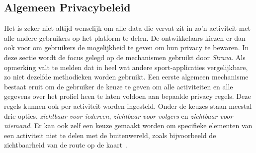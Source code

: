 \subsection{Algemeen Privacybeleid}\label{sec:Algemene Privacy}
Het is zeker niet altijd wenselijk om alle data die vervat zit in zo'n
activiteit met alle andere gebruikers op het platform te delen. De
ontwikkelaars kiezen er dan ook voor om gebruikers de mogelijkheid te geven om
hun privacy te bewaren. In deze sectie wordt de focus gelegd op de mechanismen
gebruikt door \textit{Strava}. Als opmerking valt te melden dat in heel wat
andere sport-applicaties vergelijkbare, zo niet dezelfde methodieken worden
gebruikt. Een eerste algemeen mechanisme bestaat eruit om de gebruiker de keuze
te geven om alle activiteiten en alle gegevens over het profiel heen te laten
voldoen aan bepaalde privacy regels. Deze regels kunnen ook per activiteit
worden ingesteld. Onder de keuzes staan meestal drie opties, \textit{zichtbaar
    voor iedereen}, \textit{zichtbaar voor volgers} en \textit{zichtbaar voor
    niemand}. Er kan ook zelf een keuze gemaakt worden om specifieke elementen van
een activiteit niet te delen met de buitenwereld, zoals bijvoorbeeld de
zichtbaarheid van de route op de kaart~\cite{Activity24:online}.

